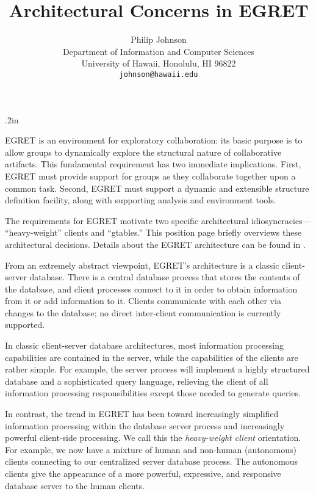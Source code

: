 \columnsep .2in
\twocolumn
\title{{\bf Architectural Concerns in EGRET}}
\author{Philip Johnson\\
             Department of Information and Computer Sciences\\
             University of Hawaii, Honolulu, HI 96822\\
             {\tt johnson@hawaii.edu}}

\maketitle
\sloppy


EGRET \cite{Johnson92a} is an environment for exploratory
collaboration: its basic purpose is to allow groups to dynamically
explore the structural nature of collaborative artifacts.  This
fundamental requirement has two immediate implications. First, EGRET
must provide support for groups as they collaborate together upon a
common task.  Second, EGRET must support a dynamic and extensible
structure definition facility, along with supporting analysis and
environment tools.  

The requirements for EGRET motivate two specific architectural
idiosyncracies--- ``heavy-weight'' clients and ``gtables.''  This
position page briefly overviews these architectural decisions.
Details about the EGRET architecture can be found in \cite{Johnson92b}.

From an extremely abstract viewpoint, EGRET's architecture is a
classic client-server database.  There is a central database process
that stores the contents of the database, and client processes connect
to it in order to obtain information from it or add information to it.
Clients communicate with each other via changes to the database; no
direct inter-client communication is currently supported.

In classic client-server database architectures, most information
processing capabilities are contained in the server, while the
capabilities of the clients are rather simple.  For example, the
server process will implement a highly structured database and a
sophisticated query language, relieving the client of all information
processing responsibilities except those needed to generate queries.

In contrast, the trend in EGRET has been toward increasingly
simplified information processing within the database server process
and increasingly powerful client-side processing.  We call this the
{\em heavy-weight client} orientation.  For example, we now have a
mixture of human and non-human (autonomous) clients connecting to 
our centralized server database process. The autonomous clients 
give the appearance of a more powerful, expressive, and responsive
database server to the human clients.   

